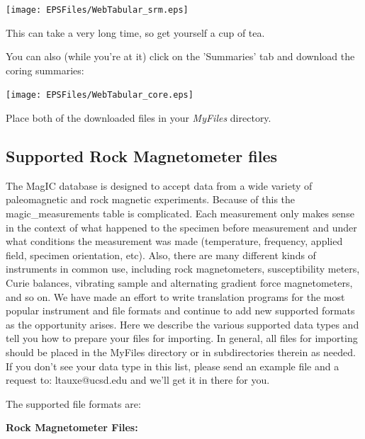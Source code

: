 \documentclass[11pt]{book}
\begin{document}
{{\texttt{[image: EPSFiles/WebTabular\_srm.eps]}

This can take a very long time, so get yourself a cup of tea.

You can also (while you're at it) click on the 'Summaries' tab and download the coring summaries:

\texttt{[image: EPSFiles/WebTabular\_core.eps]}

Place both of the downloaded files in your {\it MyFiles} directory.



\subsection{Supported Rock Magnetometer files}

The MagIC database is designed to accept data from a wide variety of paleomagnetic and rock magnetic experiments. Because of this the magic\_measurements table is complicated. Each measurement only makes sense in the context of what happened to the specimen before measurement and under what conditions the measurement was made (temperature, frequency, applied field, specimen orientation, etc). Also, there are many different kinds of instruments in common use, including rock magnetometers, susceptibility meters, Curie balances, vibrating sample and alternating gradient force magnetometers, and so on. We have made an effort to write translation programs for the most popular instrument and file formats and continue to add new supported formats as the opportunity arises. Here we describe the various supported data types and tell you how to prepare your files for importing. In general, all files for importing should be placed in the MyFiles directory or in subdirectories therein as needed.  If you don't see your data type in this list, please send an example file and a request to:  ltauxe@ucsd.edu and we'll get it in there for you.


The supported file formats are:

{\bf Rock Magnetometer Files:}

}}
\end{document}
